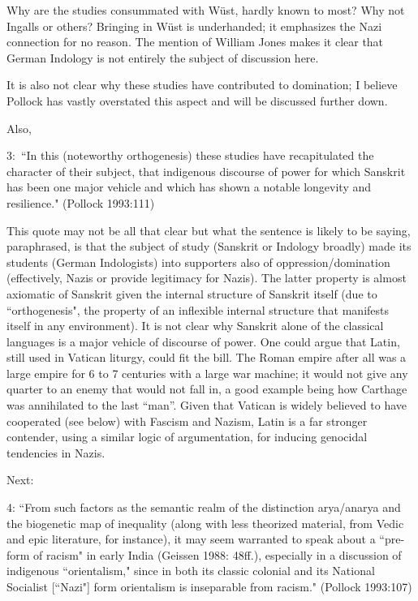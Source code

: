 {\begin{enumerate}
Why are the studies consummated with Wüst, hardly known to most?  Why not Ingalls or others? Bringing in Wüst is underhanded; it emphasizes the Nazi connection for no reason. The mention of William Jones makes it clear that German Indology is not entirely the subject of discussion here.

It is also not clear why these studies have contributed to domination; I believe Pollock has vastly overstated this aspect and will be discussed further down.

Also, 
\begin{myquote}
3:~``In this (noteworthy orthogenesis) these studies have recapitulated the character of their subject, that indigenous discourse of power for which Sanskrit has been one major vehicle and which has shown a notable longevity and resilience." \hfill(Pollock 1993:111)
\end{myquote}
\smallskip

This quote may not be all that clear but what the sentence is likely to be saying, paraphrased, is that the subject of study (Sanskrit or Indology broadly) made its students (German Indologists) into supporters also of oppression/domination (effectively, Nazis or provide legitimacy for Nazis). The latter property is almost axiomatic of Sanskrit given the internal structure of Sanskrit itself (due to ``orthogenesis", the property of an inflexible internal structure that manifests itself in any environment). It is not clear why Sanskrit alone of the classical languages is a major vehicle of discourse of power. One could argue that Latin, still used in Vatican liturgy, could fit the bill. The Roman empire after all was a large empire for 6 to 7 centuries with a large war machine; it would not give any quarter to an enemy that would not fall in, a good example being how Carthage was annihilated to the last “man”. Given that Vatican is widely believed to have cooperated (see below) with Fascism and Nazism, Latin is a far stronger contender, using a similar logic of argumentation, for inducing genocidal tendencies in Nazis.

Next: 
\begin{myquote}
4: ``From such factors as the semantic realm of the distinction arya/anarya and the biogenetic map of inequality (along with less theorized material, from Vedic and epic literature, for instance), it may seem warranted to speak about a ``pre-form of racism" in early India (Geissen 1988: 48ff.), especially in a discussion of indigenous ``orientalism," since in both its classic colonial and its National Socialist [``Nazi"] form orientalism is inseparable from racism."  \hfill(Pollock 1993:107)
\end{myquote}
\medskip


\end{enumerate}}

